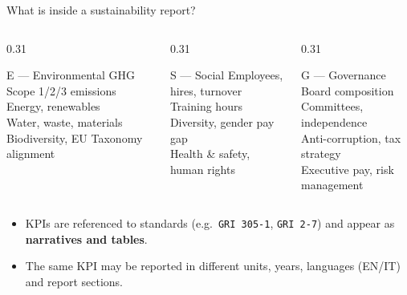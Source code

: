 \documentclass[aspectratio=169]{beamer}
\begin{document}
\begin{frame}{What is inside a sustainability report?}
  \begin{columns}[T]
    \begin{column}{0.31\textwidth}
      \begin{block}{E --- Environmental}
        \scriptsize
        GHG Scope 1/2/3 emissions\\
        Energy, renewables\\
        Water, waste, materials\\
        Biodiversity, EU Taxonomy alignment
      \end{block}
    \end{column}
    \begin{column}{0.31\textwidth}
      \begin{block}{S --- Social}
        \scriptsize
        Employees, hires, turnover\\
        Training hours\\
        Diversity, gender pay gap\\
        Health \& safety, human rights
      \end{block}
    \end{column}
    \begin{column}{0.31\textwidth}
      \begin{block}{G --- Governance}
        \scriptsize
        Board composition\\
        Committees, independence\\
        Anti-corruption, tax strategy\\
        Executive pay, risk management
      \end{block}
    \end{column}
  \end{columns}
  \vspace{2mm}
  \begin{itemize}
    \item KPIs are referenced to standards (e.g.\ \texttt{GRI 305-1}, \texttt{GRI 2-7}) and appear as \textbf{narratives and tables}.
    \item The same KPI may be reported in different units, years, languages (EN/IT) and report sections.
  \end{itemize}
\end{frame}
\end{document}
